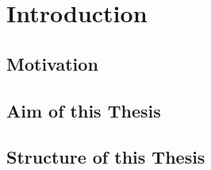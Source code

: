 \chapter{Introduction}

\section{Motivation}

\section{Aim of this Thesis}

\section{Structure of this Thesis}